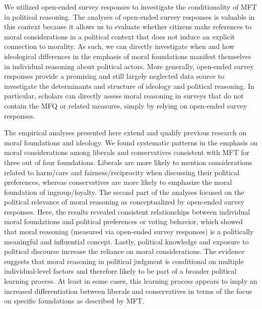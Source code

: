 \documentclass[12pt]{article}
\begin{document}
We utilized open-ended survey responses to investigate the conditionality of MFT in political reasoning. The analyses of open-ended survey responses is valuable in this context because it allows us to evaluate whether citizens make references to moral considerations in a political context that does not induce an explicit connection to morality. As such, we can directly investigate when and how ideological differences in the emphasis of moral foundations manifest themselves in individual reasoning about political actors. More generally, open-ended survey responses provide a promising and still largely neglected data source to investigate the determinants and structure of ideology and political reasoning. In particular, scholars can directly assess moral reasoning in surveys that do not contain the MFQ or related measures, simply by relying on open-ended survey responses.

The empirical analyses presented here extend and qualify previous research on moral foundations and ideology. We found systematic patterns in the emphasis on moral considerations among liberals and conservatives consistent with MFT for three out of four foundations. Liberals are more likely to mention considerations related to harm/care and fairness/reciprocity when discussing their political preferences, whereas conservatives are more likely to emphasize the moral foundation of ingroup/loyalty. The second part of the analyses focused on the political relevance of moral reasoning as conceptualized by open-ended survey responses. Here, the results revealed consistent relationships between individual moral foundations and political preferences or voting behavior, which showed that moral reasoning (measured via open-ended survey responses) is a politically meaningful and influential concept. Lastly, political knowledge and exposure to political discourse increase the reliance on moral considerations. The evidence suggests that moral reasoning in political judgment is conditional on multiple individual-level factors and therefore likely to be part of a broader political learning process. At least in some cases, this learning process appears to imply an increased differentiation between liberals and conservatives in terms of the focus on specific foundations as described by MFT.
\end{document}
